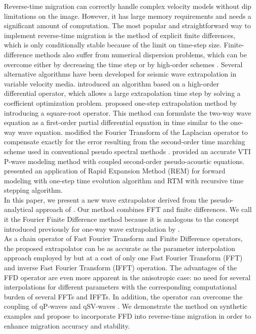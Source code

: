 Reverse-time migration can correctly handle complex velocity models
without dip limitations on the image.  However, it has large memory
requirements and needs a significant amount of computation.  The most
popular and straightforward way to implement reverse-time migration is
the method of explicit finite differences, which is only conditionally
stable because of the limit on time-step size.  Finite-difference
methods also suffer from numerical dispersion problems, which can be
overcome either by decreasing the time step or by high-order schemes
\cite[]{Wu,liu}.  Several alternative algorithms have been developed
for seismic wave extrapolation in variable velocity media.
\cite{yu} introduced an algorithm based on a high-order differential operator, 
which allows a large extrapolation time step by solving a coefficient optimization problem.
\cite{zhang} proposed one-step extrapolation method by introducing a square-root operator. This method can formulate the two-way wave equation as a first-order partial differential equation in time similar to the one-way wave equation.
\cite{etgen} modified the Fourier Transform of the Laplacian operator to compensate exactly for the error
resulting from the second-order time marching scheme used in conventional pseudo spectral methods \cite[]{pseudo}.
\cite{fowler} provided an accurate VTI P-wave modeling method with coupled second-order pseudo-acoustic equations.
\cite{pestana} presented an application of Rapid Expansion Method (REM) \cite[]{tal} for forward modeling with one-step time evolution algorithm and RTM with recursive time stepping algorithm.\\

In this paper, we present a new wave extrapolator derived from the pseudo-analytical approach of \cite{etgen}.
Our method combines FFT and finite differences. 
We call it the Fourier Finite Difference method 
because it is analogous to the concept introduced previously for one-way wave extrapolation by \cite{ffd}.\\ 

As a chain operator of Fast Fourier Transform and Finite Difference
operators, the proposed extrapolator can be as accurate as the
parameter interpolation approach employed by \cite{etgen} but at a
cost of only one Fast Fourier Transform (FFT) and inverse Fast Fourier
Transform (IFFT) operation.  The advantages of the FFD operator are
even more apparent in the anisotropic case: no need for several
interpolations for different parameters with the corresponding
computational burden of several FFTs and IFFTs.  In addition, the
operator can overcome the coupling of qP-waves and qSV-waves
\cite[]{zhang2}.  We demonstrate the method on synthetic examples and
propose to incorporate FFD into reverse-time migration in order to
enhance migration accuracy and stability.

